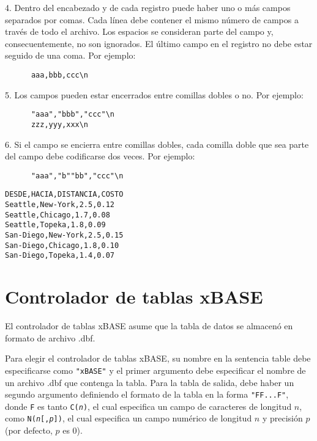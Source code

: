 \documentclass[11pt,spanish]{report}
\def\para#1{\noindent{\bf#1}}
\begin{document}
4. Dentro del encabezado y de cada registro puede haber uno o más campos separados por comas. Cada línea debe contener el mismo número de campos a través de todo el archivo. Los espacios se consideran parte del campo y, consecuentemente, no son ignorados. El último campo en el registro no debe estar seguido de una coma. Por ejemplo:

\begin{verbatim}
      aaa,bbb,ccc\n
\end{verbatim}

5. Los campos pueden estar encerrados entre comillas dobles o no. Por ejemplo:

\begin{verbatim}
      "aaa","bbb","ccc"\n
      zzz,yyy,xxx\n
\end{verbatim}

6. Si el campo se encierra entre comillas dobles, cada comilla doble que sea parte del campo debe codificarse dos veces. Por ejemplo:

\begin{verbatim}
      "aaa","b""bb","ccc"\n
\end{verbatim}

\newpage

\para{Ejemplo}

\begin{verbatim}
DESDE,HACIA,DISTANCIA,COSTO
Seattle,New-York,2.5,0.12
Seattle,Chicago,1.7,0.08
Seattle,Topeka,1.8,0.09
San-Diego,New-York,2.5,0.15
San-Diego,Chicago,1.8,0.10
San-Diego,Topeka,1.4,0.07
\end{verbatim}

\section{Controlador de tablas xBASE}

El controlador de tablas xBASE asume que la tabla de datos se almacenó en formato de archivo .dbf.

Para elegir el controlador de tablas xBASE, su nombre en la sentencia table debe especificarse como \verb|"xBASE"| y el primer argumento debe especificar el nombre de un archivo .dbf que contenga la tabla. Para la tabla de salida, debe haber un segundo argumento definiendo el formato de la tabla en la forma \verb|"FF...F"|, donde \verb|F| es tanto {\tt C({\it n})}, el cual especifica un campo de caracteres de longitud $n$, como
 {\tt N({\it n}{\rm [},{\it p}{\rm ]})}, el cual especifica un campo numérico de longitud $n$ y precisión $p$ (por defecto, $p$ es 0).
\end{document}
